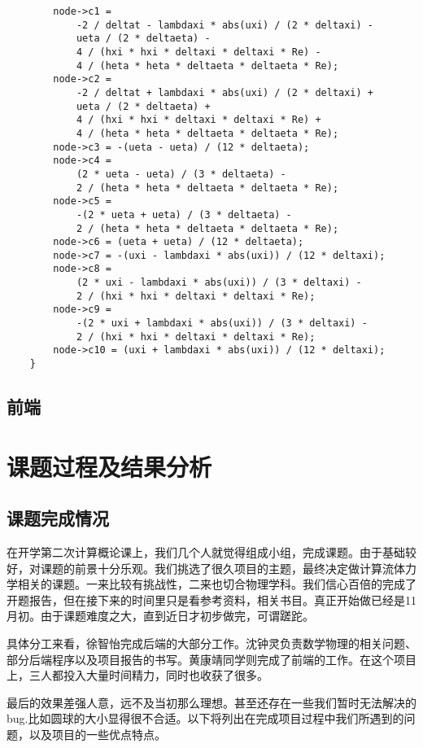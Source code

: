 \documentclass[12pt]{article}
\begin{document}
\begin{itemize}
\begin{lstlisting}
        node->c1 =
            -2 / deltat - lambdaxi * abs(uxi) / (2 * deltaxi) -
            ueta / (2 * deltaeta) -
            4 / (hxi * hxi * deltaxi * deltaxi * Re) -
            4 / (heta * heta * deltaeta * deltaeta * Re);
        node->c2 =
            -2 / deltat + lambdaxi * abs(uxi) / (2 * deltaxi) +
            ueta / (2 * deltaeta) +
            4 / (hxi * hxi * deltaxi * deltaxi * Re) +
            4 / (heta * heta * deltaeta * deltaeta * Re);
        node->c3 = -(ueta - ueta) / (12 * deltaeta);
        node->c4 =
            (2 * ueta - ueta) / (3 * deltaeta) -
            2 / (heta * heta * deltaeta * deltaeta * Re);
        node->c5 =
            -(2 * ueta + ueta) / (3 * deltaeta) -
            2 / (heta * heta * deltaeta * deltaeta * Re);
        node->c6 = (ueta + ueta) / (12 * deltaeta);
        node->c7 = -(uxi - lambdaxi * abs(uxi)) / (12 * deltaxi);
        node->c8 =
            (2 * uxi - lambdaxi * abs(uxi)) / (3 * deltaxi) -
            2 / (hxi * hxi * deltaxi * deltaxi * Re);
        node->c9 =
            -(2 * uxi + lambdaxi * abs(uxi)) / (3 * deltaxi) -
            2 / (hxi * hxi * deltaxi * deltaxi * Re);
        node->c10 = (uxi + lambdaxi * abs(uxi)) / (12 * deltaxi);
    }
\end{lstlisting}
\end{itemize}


\subsection{前端}

\section{课题过程及结果分析}
\subsection{课题完成情况}
在开学第二次计算概论课上，我们几个人就觉得组成小组，完成课题。由于基础较好，对课题的前景十分乐观。我们挑选了很久项目的主题，最终决定做计算流体力学相关的课题。一来比较有挑战性，二来也切合物理学科。我们信心百倍的完成了开题报告，但在接下来的时间里只是看参考资料，相关书目。真正开始做已经是11月初。由于课题难度之大，直到近日才初步做完，可谓蹉跎。

具体分工来看，徐智怡完成后端的大部分工作。沈钟灵负责数学物理的相关问题、部分后端程序以及项目报告的书写。黄康靖同学则完成了前端的工作。在这个项目上，三人都投入大量时间精力，同时也收获了很多。

最后的效果差强人意，远不及当初那么理想。甚至还存在一些我们暂时无法解决的bug.比如圆球的大小显得很不合适。以下将列出在完成项目过程中我们所遇到的问题，以及项目的一些优点特点。
\end{document}
